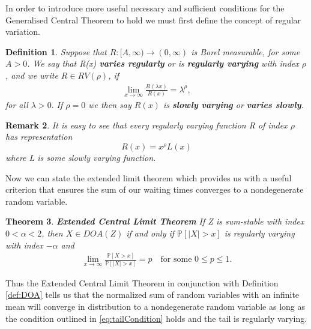 \documentclass[honours,12pt]{UNSWthesis}
\newcommand{\PP}{\mathbb{P}}
\newcommand{\1}{\mathbf 1}
\newtheorem{theorem}{Theorem}[section]
\newtheorem{definition}[theorem]{Definition}
\newtheorem{remark}[theorem]{Remark}
\numberwithin{equation}{section}
\theoremstyle{definition}
\theoremstyle{remark}
\begin{document}
In order to introduce more useful necessary and sufficient conditions for the Generalised Central Theorem to hold we must first define the concept of regular variation.
\begin{definition}\label{def:RV}
	Suppose that $R:[A,\infty)\to(0,\infty)$ is Borel measurable, for some $A>0$. We say that R(x) \textbf{varies regularly} or is \textbf{regularly varying} with index $\rho$, and we write $R\in RV(\rho)$, if
	\begin{align*}
	\lim_{x\to\infty}\frac{R(\lambda x)}{R(x)}=\lambda^\rho, 
	\end{align*}
	for all $\lambda>0.$ If $\rho=0$ we then say $R(x)$ is \textbf{slowly varying} or \textbf{varies slowly}.\\
\end{definition}
\begin{remark}
	It is easy to see that every regularly varying function R of index $\rho$ has representation
	\[
		R(x)=x^\rho L(x)
	\]
	where L is some slowly varying function.\\
\end{remark}
Now we can state the extended limit theorem which provides us with a useful criterion that ensures the sum of our waiting times converges to a nondegenerate random variable.
\begin{theorem}\label{th:ECLT}\cite[Th.~4.5]{MeerschaertSikorskii2012}
	\textbf{Extended Central Limit Theorem} If Z is sum-stable with index $0<\alpha<2$, then $X\in DOA(Z)$ if and only if $\PP[|X|>x]$ is regularly varying with index $-\alpha$ and
	\begin{align}\label{eq:tailCondition}
			\lim_{x\to\infty}\frac{\PP[X>x]}{\PP[|X|>x]}=p\quad\textrm{for some }0\leq p\leq1.
	\end{align}
\end{theorem}
\noindent Thus the Extended Central Limit Theorem in conjunction with Definition \ref{def:DOA} tells us that the normalized sum of random variables with an infinite mean will converge in distribution to a nondegenerate random variable as long as the condition outlined in \ref{eq:tailCondition} holds and the tail is regularly varying.
\end{document}
